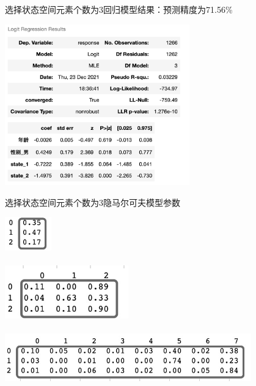 \documentclass{beamer}
\begin{document}
\begin{frame}{选择状态空间元素个数为3}{回归模型结果：预测精度为71.56\%}
    \begin{center}
\includegraphics[width=0.6\textwidth]{LR_3.png}\\
    \end{center}
\end{frame}

\begin{frame}{选择状态空间元素个数为3}{隐马尔可夫模型参数}
    \begin{center}
\includegraphics[width=0.15\textwidth]{初始分布3.jpeg}\\
\\
\includegraphics[width=0.4\textwidth]{转移概率矩阵3.jpeg}\\
\\
\includegraphics[width=0.8\textwidth]{输出概率矩阵3.jpeg}\\
    \end{center}
\end{frame}
\end{document}

